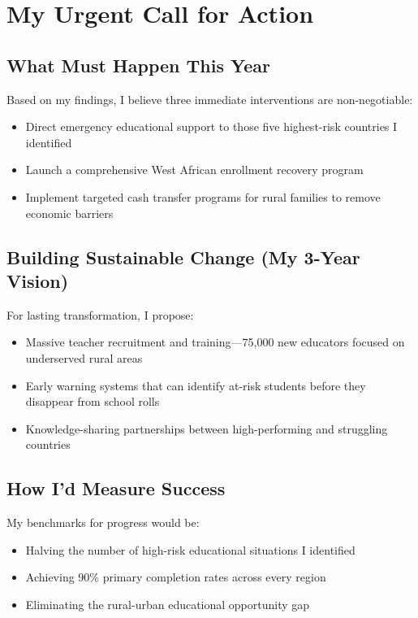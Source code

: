 \documentclass[12pt,a4paper]{article}
\begin{document}
\section{My Urgent Call for Action}

\subsection{What Must Happen This Year}

Based on my findings, I believe three immediate interventions are non-negotiable:

\begin{itemize}
    \item Direct emergency educational support to those five highest-risk countries I identified
    \item Launch a comprehensive West African enrollment recovery program
    \item Implement targeted cash transfer programs for rural families to remove economic barriers
\end{itemize}

\subsection{Building Sustainable Change (My 3-Year Vision)}

For lasting transformation, I propose:

\begin{itemize}
    \item Massive teacher recruitment and training---75,000 new educators focused on underserved rural areas
    \item Early warning systems that can identify at-risk students before they disappear from school rolls
    \item Knowledge-sharing partnerships between high-performing and struggling countries
\end{itemize}

\subsection{How I'd Measure Success}

My benchmarks for progress would be:

\begin{itemize}
    \item Halving the number of high-risk educational situations I identified
    \item Achieving 90\% primary completion rates across every region
    \item Eliminating the rural-urban educational opportunity gap
\end{itemize}
\end{document}
